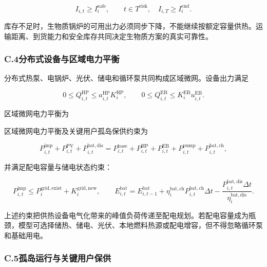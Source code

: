 \begin{equation}
I_{i,t}\geq I_i^{\mathrm{safe}},
\qquad t\in T^{\mathrm{risk}},
\quad
I_{i,T}\geq I_i^{\mathrm{end}}.
\label{eq:biomass_safety_stock}
\end{equation}

库存不足时，生物质锅炉的可用出力必须同步下降，不能继续按额定容量供热。运输距离、到货能力和安全库存共同决定生物质方案的真实可靠性。

\subsubsection*{C.4\quad 分布式设备与区域电力平衡}

分布式热泵、电锅炉、光伏、储电和循环泵共同构成区域微网。设备出力满足

\begin{equation}
0\leq Q_{i,t}^{\mathrm{HP}}\leq a_{i,t}^{\mathrm{HP}}K_i^{\mathrm{HP}},
\qquad
0\leq Q_{i,t}^{\mathrm{EB}}\leq K_i^{\mathrm{EB}}u_{i,t}^{\mathrm{EB}}.
\label{eq:guyuan_devices}
\end{equation}

区域微网电力平衡为

区域微网电力平衡及关键用户孤岛保供约束为

\begin{equation}
P_{i,t}^{\mathrm{imp}}+P_{i,t}^{\mathrm{PV}}+P_{i,t}^{\mathrm{bat,dis}}
=P_{i,t}^{\mathrm{base}}+P_{i,t}^{\mathrm{HP}}+P_{i,t}^{\mathrm{EB}}
+P_{i,t}^{\mathrm{pump}}+P_{i,t}^{\mathrm{bat,ch}},
\label{eq:microgrid}
\end{equation}

并满足配电容量与储电状态约束：

\begin{equation}
P_{i,t}^{\mathrm{imp}}\leq P_i^{\mathrm{grid,exist}}+K_i^{\mathrm{grid,new}},
\qquad
E_{i,t}^{\mathrm{bat}}=E_{i,t-1}^{\mathrm{bat}}
+\eta_i^{\mathrm{bat,ch}}P_{i,t}^{\mathrm{bat,ch}}\Delta t
-\frac{P_{i,t}^{\mathrm{bat,dis}}\Delta t}{\eta_i^{\mathrm{bat,dis}}}.
\label{eq:guyuan_grid_battery}
\end{equation}

上述约束把供热设备电气化带来的峰值负荷传递至配电规划。若配电容量成为瓶颈，模型可选择储热、储电、光伏、本地燃料热源或配电增容，但不得忽略循环泵和基础用电。

\subsubsection*{C.5\quad 孤岛运行与关键用户保供}

